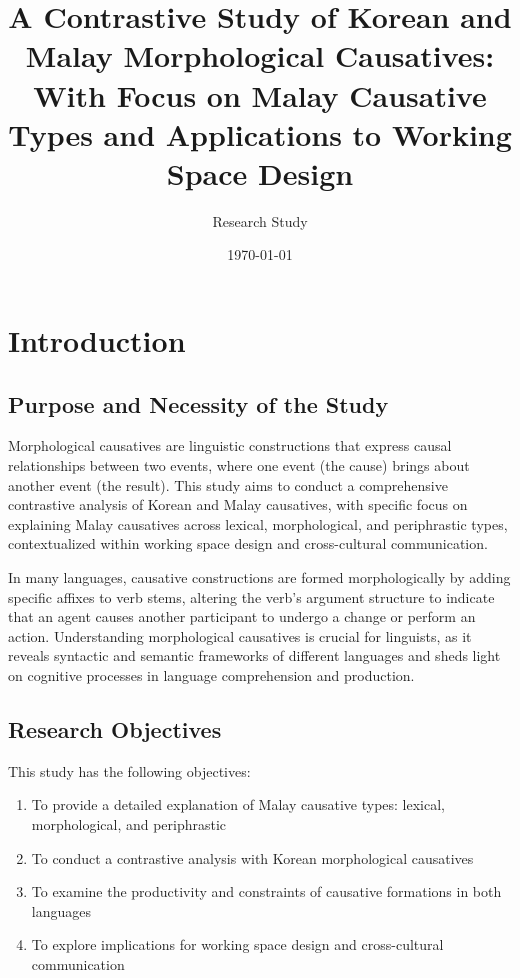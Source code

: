 \documentclass[12pt,a4paper]{article}
\title{A Contrastive Study of Korean and Malay Morphological Causatives: \\
\large With Focus on Malay Causative Types and Applications to Working Space Design}
\author{Research Study}
\date{\today}
\begin{document}
\maketitle

\tableofcontents
\newpage

\section{Introduction}

\subsection{Purpose and Necessity of the Study}

Morphological causatives are linguistic constructions that express causal relationships between two events, where one event (the cause) brings about another event (the result). This study aims to conduct a comprehensive contrastive analysis of Korean and Malay causatives, with specific focus on explaining Malay causatives across lexical, morphological, and periphrastic types, contextualized within working space design and cross-cultural communication.

In many languages, causative constructions are formed morphologically by adding specific affixes to verb stems, altering the verb's argument structure to indicate that an agent causes another participant to undergo a change or perform an action. Understanding morphological causatives is crucial for linguists, as it reveals syntactic and semantic frameworks of different languages and sheds light on cognitive processes in language comprehension and production.

\subsection{Research Objectives}

This study has the following objectives:

\begin{enumerate}
\item To provide a detailed explanation of Malay causative types: lexical, morphological, and periphrastic
\item To conduct a contrastive analysis with Korean morphological causatives
\item To examine the productivity and constraints of causative formations in both languages
\item To explore implications for working space design and cross-cultural communication
\end{enumerate}
\end{document}
